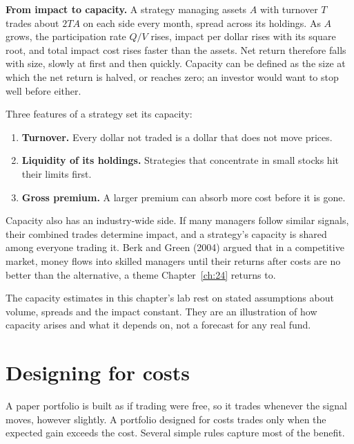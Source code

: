 \textbf{From impact to capacity.} A strategy managing assets $A$ with turnover $T$ trades about $2TA$ on each side every month, spread across its holdings. As $A$ grows, the participation rate $Q/V$ rises, impact per dollar rises with its square root, and total impact cost rises faster than the assets. Net return therefore falls with size, slowly at first and then quickly. Capacity can be defined as the size at which the net return is halved, or reaches zero; an investor would want to stop well before either.

Three features of a strategy set its capacity:

\begin{enumerate}
  \item \textbf{Turnover.} Every dollar not traded is a dollar that does not move prices.
  \item \textbf{Liquidity of its holdings.} Strategies that concentrate in small stocks hit their limits first.
  \item \textbf{Gross premium.} A larger premium can absorb more cost before it is gone.
\end{enumerate}

Capacity also has an industry-wide side. If many managers follow similar signals, their combined trades determine impact, and a strategy's capacity is shared among everyone trading it. Berk and Green (2004) argued that in a competitive market, money flows into skilled managers until their returns after costs are no better than the alternative, a theme Chapter~\ref{ch:24} returns to.

The capacity estimates in this chapter's lab rest on stated assumptions about volume, spreads and the impact constant. They are an illustration of how capacity arises and what it depends on, not a forecast for any real fund.

\section{Designing for costs}
\label{sec:06-design}

A paper portfolio is built as if trading were free, so it trades whenever the signal moves, however slightly. A portfolio designed for costs trades only when the expected gain exceeds the cost. Several simple rules capture most of the benefit.

